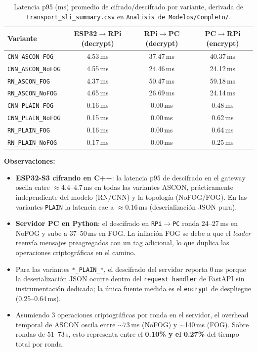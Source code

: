\begin{table}[H]
\centering
\caption{Latencia p95 (ms) promedio de cifrado/descifrado por variante, derivada de \texttt{transport\_sli\_summary.csv} en \texttt{Analisis de Modelos/Completo/}.}
\label{tab:ascon_time}
\small
\begin{tabular}{l c c c}
\toprule
\textbf{Variante} & \textbf{ESP32$\to$RPi (decrypt)} & \textbf{RPi$\to$PC (decrypt)} & \textbf{PC$\to$RPi (encrypt)} \\
\midrule
\texttt{CNN\_ASCON\_FOG}     & 4.53\,ms & 37.47\,ms & 40.37\,ms \\
\texttt{CNN\_ASCON\_NoFOG}   & 4.55\,ms & 24.46\,ms & 24.12\,ms \\
\texttt{RN\_ASCON\_FOG}      & 4.37\,ms & 50.47\,ms & 59.18\,ms \\
\texttt{RN\_ASCON\_NoFOG}    & 4.65\,ms & 26.69\,ms & 24.14\,ms \\
\midrule
\texttt{CNN\_PLAIN\_FOG}     & 0.16\,ms &  0.00\,ms &  0.48\,ms \\
\texttt{CNN\_PLAIN\_NoFOG}   & 0.15\,ms &  0.00\,ms &  0.62\,ms \\
\texttt{RN\_PLAIN\_FOG}      & 0.16\,ms &  0.00\,ms &  0.64\,ms \\
\texttt{RN\_PLAIN\_NoFOG}    & 0.17\,ms &  0.00\,ms &  0.25\,ms \\
\bottomrule
\end{tabular}
\end{table}

\textbf{Observaciones:}
\begin{itemize}[noitemsep, topsep=0pt]
    \item \textbf{ESP32-S3 cifrando en C++}: la latencia p95 de descifrado en el gateway oscila entre $\approx$4.4--4.7\,ms en todas las variantes ASCON, prácticamente independiente del modelo (RN/CNN) y la topología (NoFOG/FOG). En las variantes \texttt{PLAIN} la latencia cae a $\approx$0.16\,ms (deserialización JSON pura).
    \item \textbf{Servidor PC en Python}: el descifrado en \texttt{RPi$\to$PC} ronda 24--27\,ms en NoFOG y sube a 37--50\,ms en FOG. La inflación FOG se debe a que el \emph{leader} reenvía mensajes preagregados con un tag adicional, lo que duplica las operaciones criptográficas en el camino.
    \item Para las variantes \texttt{*\_PLAIN\_*}, el descifrado del servidor reporta 0\,ms porque la deserialización JSON ocurre dentro del \texttt{request handler} de FastAPI sin instrumentación dedicada; la única fuente medida es el \texttt{encrypt} de despliegue (0.25--0.64\,ms).
    \item Asumiendo 3 operaciones criptográficas por ronda en el servidor, el overhead temporal de ASCON oscila entre $\sim$73\,ms (NoFOG) y $\sim$140\,ms (FOG). Sobre rondas de 51--73\,s, esto representa entre el \textbf{0.10\% y el 0.27\%} del tiempo total por ronda.
\end{itemize}

